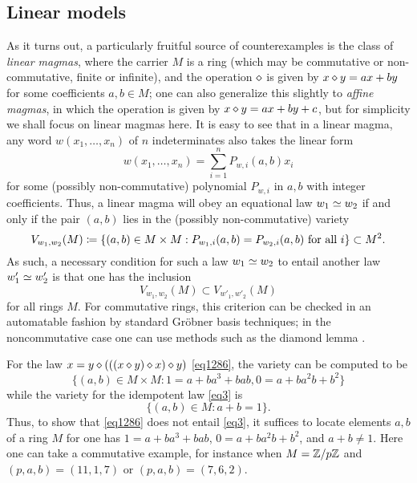 \subsection{Linear models}\label{linear-sec}

As it turns out, a particularly fruitful source of counterexamples is the class of \emph{linear magmas}, where the carrier $M$ is a ring (which may be commutative or non-commutative, finite or infinite), and the operation $\diamond$ is given by $x \diamond y = ax + by$ for some coefficients $a,b \in M$; one can also generalize this slightly to \emph{affine magmas}, in which the operation is given by $x \diamond y = ax + by + c$, but for simplicity we shall focus on linear magmas here.  It is easy to see that in a linear magma, any word $w(x_1,\dots,x_n)$ of $n$ indeterminates also takes the linear form
$$ w(x_1,\dots,x_n) = \sum_{i=1}^n P_{w,i}(a,b) x_i$$
for some (possibly non-commutative) polynomial $P_{w,i}$ in $a,b$ with integer coefficients.  Thus, a linear magma will obey an equational law $w_1 \simeq w_2$ if and only if the pair $(a,b)$ lies in the (possibly non-commutative) variety
\begin{equation}\label{variety}
  V_{w_1,w_2}(M) \coloneqq \{ (a,b) \in M \times M: P_{w_1,i}(a,b) = P_{w_2,i}(a,b) \hbox{ for all } i \} \subset M^2.
\end{equation}
As such, a necessary condition for such a law $w_1 \simeq w_2$ to entail another law $w'_1 \simeq w'_2$ is that one has the inclusion
$$ V_{w_1,w_2}(M) \subset V_{w'_1,w'_2}(M)
$$
for all rings $M$.  For commutative rings, this criterion can be checked in an automatable fashion by standard Gr\"obner basis techniques; in the noncommutative case one can use methods such as the diamond lemma \cite{diamond-lemma}.

\begin{example}\label{1286-ex} For the law $x = y \diamond (((x \diamond y) \diamond x) \diamond y)$ \eqref{eq1286}, the variety  can be computed to be
$$ \{ (a,b) \in M \times M: 1 = a+ba^3+bab, 0 = a + ba^2 b + b^2 \}$$
while the variety for the idempotent law \eqref{eq3} is
$$ \{ (a,b) \in M: a+b=1 \}.$$
Thus, to show that \eqref{eq1286} does not entail \eqref{eq3}, it suffices to locate elements $a,b$ of a ring $M$ for one has $1 = a+ba^3+bab$, $0 = a + ba^2 b + b^2$, and $a+b \neq 1$.  Here one can take a commutative example, for instance when $M = \mathbb{Z}/p\mathbb{Z}$ and $(p,a,b) = (11,1,7)$ or $(p,a,b)=(7,6,2)$.
\end{example}

